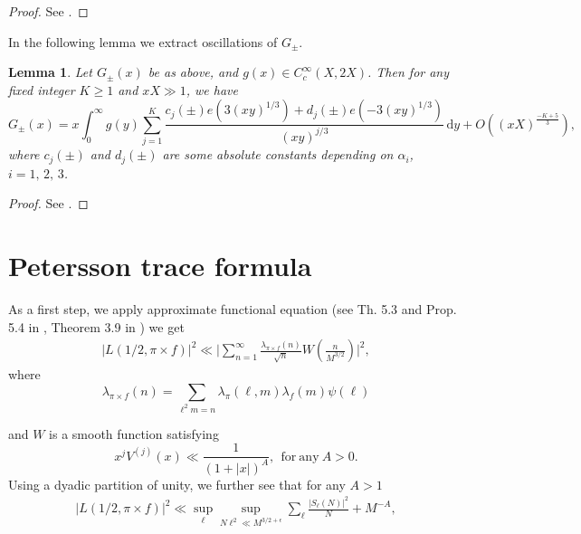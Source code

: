 \documentclass[12pt,a4paper,twoside, reqno]{amsart}
\newtheorem{lemma}{Lemma}
\begin{document}
\begin{proof}
	See \cite{Li09}. 
\end{proof}
In the following lemma we extract  oscillations of  $G_{\pm}$. 
\begin{lemma} \label{GL3oscilation}
	Let $G_{\pm}(x)$ be as above,  and  $g(x) \in C_c^{\infty}(X,2X)$. Then for any fixed integer $K \geq 1$ and $xX \gg 1$, we have
	\begin{equation*}
		G_{\pm}(x)=  x \int_{0}^{\infty} g(y) \sum_{j=1}^{K} \frac{c_{j}({\pm}) e\left(3 (xy)^{1/3} \right) + d_{j}({\pm}) e\left(-3 (xy)^{1/3} \right)}{\left( xy\right)^{j/3}} \, \mathrm{d} y + O \left((xX)^{\frac{-K+5}{3}}\right),
	\end{equation*}
	where $c_{j}(\pm)$ and $d_{j}(\pm)$ are some   absolute constants depending on $\alpha_{i}$,  $i=1,\, 2,\, 3$.  
\end{lemma}
\begin{proof}
	See   \cite[Lemma 6.1]{Li09}.
\end{proof}




\section{Petersson trace formula}
As a first step, we apply approximate functional equation  (see Th. 5.3 and Prop. 5.4 in \cite{IK04}, Theorem 3.9 in \cite{BKL18}) we get  
\begin{align*}
    |L(1/2, \pi \times f)|^2 \ll  \Big| \sum_{n=1}^{\infty} \frac{ \lambda_{\pi \times f}(n)}{\sqrt{n}}W\left( \frac{n}{M^{3/2}}\right)\Big|^2,
\end{align*}
where 
\[ \lambda_{\pi \times f}(n)= \sum_{\ell^2m=n} \lambda_\pi(\ell,m)\lambda_f(m)\psi(\ell) \]

and $W$ is a smooth function satisfying
\[x^jV^{(j)}(x) \ll \frac{1}{(1+|x|)^A}, \ \ \mathrm{for \ any \ } A>0. \]
Using a dyadic partition of unity, we further see that for any $A> 1$
\begin{align}\label{AFE}
    |L(1/2, \pi \times f)|^2 \ll \sup_\ell \sup_{N\ell^2 \ll M^{3/2+\epsilon}}\sum_{\ell} \frac{|S_\ell(N)|^2}{N}+M^{-A},
    \end{align}
\end{document}
